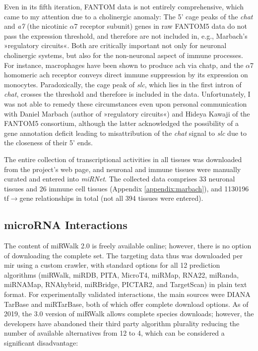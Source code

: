 Even in its fifth iteration, FANTOM data is not entirely comprehensive, which came to my attention due to a cholinergic anomaly: The 5' \ac{cage} peaks of the \textit{\ac{chat}} and \textit{\acs{a7}} (the nicotinic $\alpha$7 receptor subunit) genes in raw FANTOM5 data do not pass the expression threshold, and therefore are not included in, e.g., Marbach's »regulatory circuits«. Both are critically important not only for neuronal cholinergic systems, but also for the non-neuronal aspect of immune processes. For instance, macrophages have been shown to produce \ac{ach} via \ac{chatp}, and the $\alpha$7 homomeric \ac{ach} receptor conveys direct immune suppression by its expression on monocytes.\cite{Fujii2017} Paradoxically, the \ac{cage} peak of \textit{\ac{slc}}, which lies in the first intron of \textit{\ac{chat}}, crosses the threshold and therefore is included in the data. Unfortunately, I was not able to remedy these circumstances even upon personal communication with Daniel Marbach (author of »regulatory circuits«) and Hideya Kawaji of the FANTOM5 consortium, although the latter acknowledged the possibility of a gene annotation deficit leading to misattribution of the \textit{\ac{chat}} signal to \textit{\ac{slc}} due to the closeness of their 5' ends.

The entire collection of transcriptional activities in all tissues was downloaded from the project's web page,\cite{Marbach2016} and neuronal and immune tissues were manually curated and entered into \textit{miRNet}. The collected data comprises 33 neuronal tissues and 26 immune cell tissues (Appendix \ref{appendix:marbach}), and \num{1130196} \ac{tf}$\to$gene relationships in total (not all 394 tissues were entered). 

\subsection{microRNA Interactions} \label{sec:database:mirna}
The content of miRWalk 2.0 is freely available online;\cite{miRWalk2} however, there is no option of downloading the complete set. The targeting data thus was downloaded per \ac{mir} using a custom crawler, with standard options for all 12 prediction algorithms (miRWalk, miRDB, PITA, MicroT4, miRMap, RNA22, miRanda, miRNAMap, RNAhybrid, miRBridge, PICTAR2, and TargetScan) in plain text format. For experimentally validated interactions, the main sources were DIANA TarBase\cite{Karagkouni2018} and miRTarBase,\cite{Chou2018} both of which offer complete download options. As of 2019, the 3.0 version of miRWalk allows complete species downloads; however, the developers have abandoned their third party algorithm plurality reducing the number of available alternatives from 12 to 4, which can be considered a significant disadvantage:

